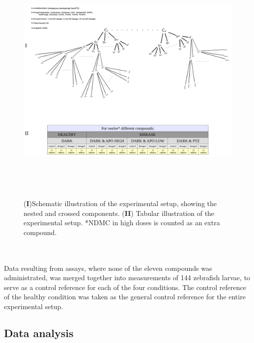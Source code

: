 \documentclass[a4paper,12pt]{article}
\begin{document}
\begin{figure}[h]
\begin{center}
\includegraphics[width=17cm,height=12.5cm]{expdesignComb.png}
\caption{(\textbf{I})Schematic illustration of the experimental setup, showing the nested and crossed components. (\textbf{II}) Tabular illustration of the experimental setup. *NDMC in high doses is counted as an extra compound.}
\end{center}
\end{figure}
\\\\
Data resulting from assays, where none of the eleven compounds was administrated, was merged together into measurements of 144 zebrafish larvae, to serve as a control reference for each of the four conditions. The control reference of the healthy condition was taken as the general control reference for the entire experimental setup. 
\subsection{Data analysis}
\end{document}
